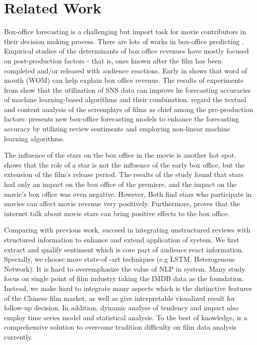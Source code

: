 \section{Related Work}
\label{sec:related}
\par Box-office forecasting is a challenging but import task for movie contributors in their decision making process. There are lots of works in box-office predicting \cite{sochay1994predicting,zhang2009forecasting}. Empirical studies of the determinants of box office revenues have mostly focused on post-production factors - that is, ones known after the film has been completed and/or released with audience reactions. Early in \cite{liu2006word} shows that word of mouth (WOM) can help explain box office revenue. The results of experiments from \cite{kim2015box} show that the utilization of SNS data can improve he forecasting accuracies of machine learning-based algorithms and their combination. \cite{hunter2016predicting} regard the textual and content analysis of the screenplays of films as chief among the pre-production factors. \cite{hur2016box} presents new box-office forecasting models to enhance the forecasting accuracy by utilizing review sentiments and employing non-linear machine learning algorithms.

\par The influence of the stars on the box office in the movie is another hot spot. \cite{de1999uncertainty} shows that the role of a star is not the influence of the early box office, but the extension of the film's release period. The results of the study\cite{chang2005devising} found that stars had only an impact on the box office of the premiere, and the impact on the movie's box office was even negative. However, Both \cite{elberse2007power,nelson2012movie} find stars who participate in movies can affect movie revenue very positively. Furthermore, \cite{karniouchina2011impact} proves that the internet talk about movie stars can bring positive effects to the box office.

\par Comparing with previous work, \system succeed in integrating unstructured reviews with structured information to enhance and extend application of system. We first extract and qualify sentiment which is core part of audience react information. Specially, we choose more state-of -art techniques (e.g LSTM\cite{katiyar2016investigating}, Heterogenous Network\cite{sun2012when}). It is hard to overemphasize the value of NLP in system. Many study \cite{kim2015box,hur2016box,tang2015target-dependent} focus on single point of film industry taking the IMDB data as the foundation. Instead, we make hard to integrate many aspects which is the distinctive features of the Chinese film market, as well as give interpretable visualized result for follow-up decision. In addition, dynamic analyse of tendency and impact also employ time series model and statistical analysis. To the best of knowledge, \system is a comprehensive solution to overcome tradition difficulty on film data analysis currently.

